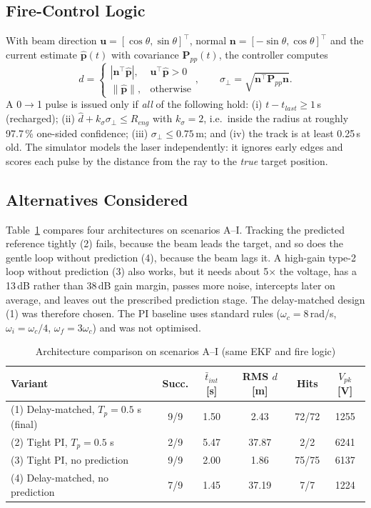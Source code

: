 \documentclass[conference]{IEEEtran}
\newcommand{\vect}[1]{\mathbf{#1}}
\begin{document}
\subsection{Fire-Control Logic}
With beam direction $\vect u=[\cos\theta,\sin\theta]^\top$, normal
$\vect n=[-\sin\theta,\cos\theta]^\top$ and the current estimate $\hat{\vect p}(t)$
with covariance $\vect P_{pp}(t)$, the controller computes
\begin{equation}
\hat d=\begin{cases}|\vect n^\top\hat{\vect p}|,& \vect u^\top\hat{\vect p}>0\\ \|\hat{\vect p}\|,&\text{otherwise}\end{cases},\qquad
\sigma_\perp=\sqrt{\vect n^\top\vect P_{pp}\vect n}.
\end{equation}
A 0$\to$1 pulse is issued only if \emph{all} of the following hold:
(i) $t-t_{last}\ge1$\,s (recharged);
(ii) $\hat d+k_\sigma\sigma_\perp\le R_{eng}$ with $k_\sigma=2$, i.e.\
inside the radius at roughly 97.7\,\% one-sided confidence;
(iii) $\sigma_\perp\le0.75$\,m; and
(iv) the track is at least 0.25\,s old.
The simulator models the laser independently: it ignores early edges and scores
each pulse by the distance from the ray to the \emph{true} target position.

\subsection{Alternatives Considered}
Table~\ref{tab:cmp} compares four architectures on scenarios A--I.
Tracking the predicted reference tightly (2) fails, because the beam leads the
target, and so does the gentle loop without prediction (4), because the beam
lags it. A high-gain type-2 loop without prediction (3) also works, but it needs
about 5$\times$ the voltage, has a 13\,dB rather than 38\,dB gain margin, passes
more noise, intercepts later on average, and leaves out the prescribed
prediction stage. The delay-matched design (1) was therefore chosen. The PI
baseline uses standard rules ($\omega_c=8$\,rad/s, $\omega_i=\omega_c/4$,
$\omega_f=3\omega_c$) and was not optimised.

\begin{table}[!t]
\centering
\caption{Architecture comparison on scenarios A--I (same EKF and fire logic)}
\label{tab:cmp}
\footnotesize
\setlength{\tabcolsep}{3pt}
\renewcommand{\arraystretch}{1.1}
\begin{tabularx}{\columnwidth}{@{}>{\raggedright\arraybackslash}Xccccc@{}}
\toprule
Variant & Succ. & $\bar t_{int}$ [s] & RMS $d$ [m] & Hits & $V_{pk}$ [V]\\
\midrule
(1) Delay-matched, $T_p=0.5$ s (final) & 9/9 & 1.50 & 2.43 & 72/72 & 1255 \\
(2) Tight PI, $T_p=0.5$ s & 2/9 & 5.47 & 37.87 & 2/2 & 6241 \\
(3) Tight PI, no prediction & 9/9 & 2.00 & 1.86 & 75/75 & 6137 \\
(4) Delay-matched, no prediction & 7/9 & 1.45 & 37.19 & 7/7 & 1224 \\
\bottomrule
\end{tabularx}
\end{table}
\end{document}
